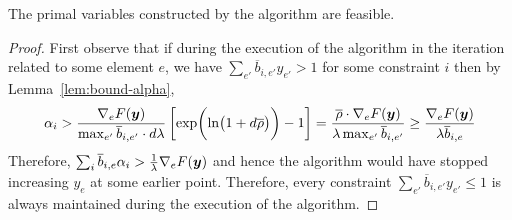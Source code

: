 \begin{lemma}		\label{lem:packing-primal-feasible}
The primal variables constructed by the algorithm are feasible. 
\end{lemma}
%
\begin{proof}
First observe that if during the execution of the algorithm in the iteration related to some element $e$,  we have
$\sum_{e'} \overline{b}_{i,e'}  y_{e'}  > 1$ for some constraint $i$ then by Lemma~\ref{lem:bound-alpha},
$$
\alpha_{i} 
>  \frac{\nabla_{e} F(\bm{y})}{\max_{e'}  \overline{b}_{i,e'}  \cdot d\lambda } 
		\left[ \exp\biggl( \ln \bigl(1+ d\overline{\rho} \bigr)  \biggr) - 1 \right]
= \frac{\overline{\rho} \cdot \nabla_{e} F(\bm{y})}{\lambda \max_{e'}  \overline{b}_{i,e'} }
\geq \frac{\nabla_{e} F(\bm{y})}{\lambda \overline{b}_{i,e} }
$$
Therefore, $\sum_{i} \overline{b}_{i,e}  \alpha_{i} > \frac{1}{\lambda} \nabla_{e} F(\bm{y})$ and hence the algorithm would have 
stopped increasing $y_{e} $ at some earlier point. 
Therefore, every constraint $\sum_{e'} \overline{b}_{i,e'}  y_{e'}  \leq 1$ is always maintained during the execution of the algorithm. 


\end{proof}
